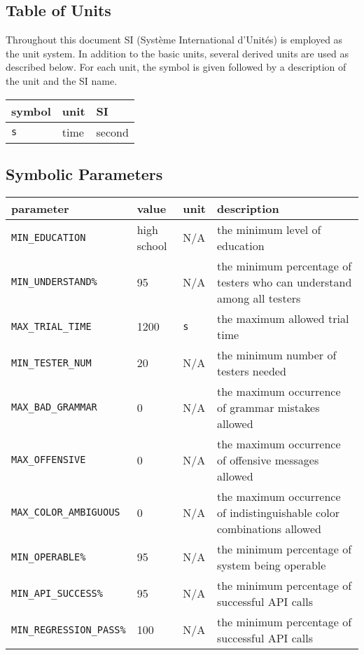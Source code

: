 \documentclass[12pt]{article}
\begin{document}
\subsection{Table of Units}

Throughout this document SI (Syst\`{e}me International d'Unit\'{e}s) is employed
as the unit system.  In addition to the basic units, several derived units are
used as described below.  For each unit, the symbol is given followed by a
description of the unit and the SI name.

\begin{tabular}{ |l|l|l|  }

\hline
symbol & unit & SI \\
\hline
\texttt{s} & time & second\\
\hline
\end{tabular}

\subsection{Symbolic Parameters}

\begin{tabular}{|l|l|l|p{5cm}|}

\hline
parameter & value & unit & description\\
\hline
\texttt{MIN\_EDUCATION} & high school & N/A & the minimum level of education\\
\hline
\texttt{MIN\_UNDERSTAND\%} & 95 & N/A & the minimum percentage of testers who can understand among all testers\\
\hline
\texttt{MAX\_TRIAL\_TIME} & 1200 & \texttt{s} & the maximum allowed trial time\\
\hline
\texttt{MIN\_TESTER\_NUM} &  20& N/A & the minimum number of testers needed\\
\hline
\texttt{MAX\_BAD\_GRAMMAR} & 0& N/A & the maximum occurrence of grammar mistakes allowed \\
\hline
\texttt{MAX\_OFFENSIVE} & 0& N/A & the maximum occurrence of offensive messages allowed\\
\hline
\texttt{MAX\_COLOR\_AMBIGUOUS} & 0& N/A & the maximum occurrence of indistinguishable color combinations allowed\\
\hline
\texttt{MIN\_OPERABLE\%} & 95 & N/A & the minimum percentage of system being operable \\
\hline
\texttt{MIN\_API\_SUCCESS\%} & 95 & N/A &  the minimum percentage of successful API calls\\
\hline
\texttt{MIN\_REGRESSION\_PASS\%} & 100  & N/A &  the minimum percentage of successful API calls\\
\hline
\end{tabular}
\end{document}
